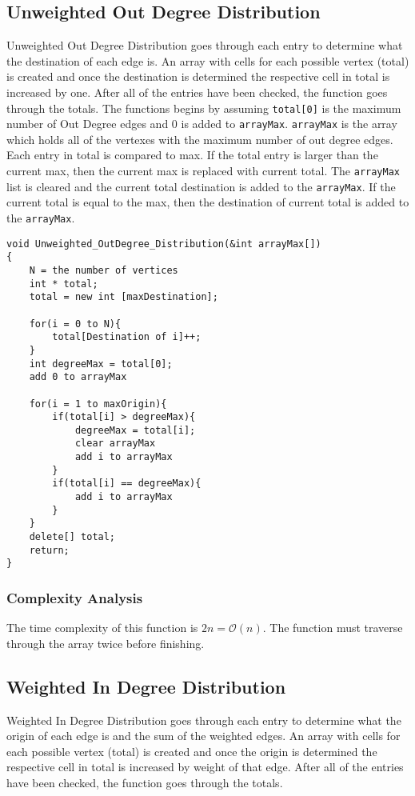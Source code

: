 \documentclass{article}
\begin{document}
\subsection{Unweighted Out Degree Distribution}
Unweighted Out Degree Distribution goes through each entry to determine what the destination of each edge is. An array with cells for each possible vertex (total) is created
and once the destination is determined the respective cell in total is increased by one. After all of the entries have been checked, the function goes through the totals.
The functions begins by assuming \texttt{total[0]} is the maximum number of Out Degree edges and $0$ is added to \texttt{arrayMax}. \texttt{arrayMax} is the array which holds all of the vertexes with the maximum number of out degree edges. Each entry in total is compared to max. If the total entry is larger than the current max, then the current max is replaced with current
total. The \texttt{arrayMax} list is cleared and the current total destination is added to the \texttt{arrayMax}. If the current total is equal to the max, then the destination of current total is added to the \texttt{arrayMax}.

\begin{verbatim}
void Unweighted_OutDegree_Distribution(&int arrayMax[])
{
    N = the number of vertices
    int * total;
    total = new int [maxDestination];

    for(i = 0 to N){
        total[Destination of i]++;
    }
    int degreeMax = total[0];
    add 0 to arrayMax

    for(i = 1 to maxOrigin){
        if(total[i] > degreeMax){
            degreeMax = total[i];
            clear arrayMax
            add i to arrayMax
        }
        if(total[i] == degreeMax){
            add i to arrayMax
        }
    }
    delete[] total;
    return;
}
\end{verbatim}

\subsubsection{Complexity Analysis}
The time complexity of this function is $2n = \mathcal{O}(n)$. The function must traverse through the array twice before finishing.

\subsection{Weighted In Degree Distribution}
Weighted In Degree Distribution goes through each entry to determine what the origin of each edge is and the sum of the weighted edges. An array with cells for each possible vertex (total) is created and once the origin is determined the respective cell in total is increased by weight of that edge. After all of the entries have been checked, the function goes through the totals.
\end{document}
